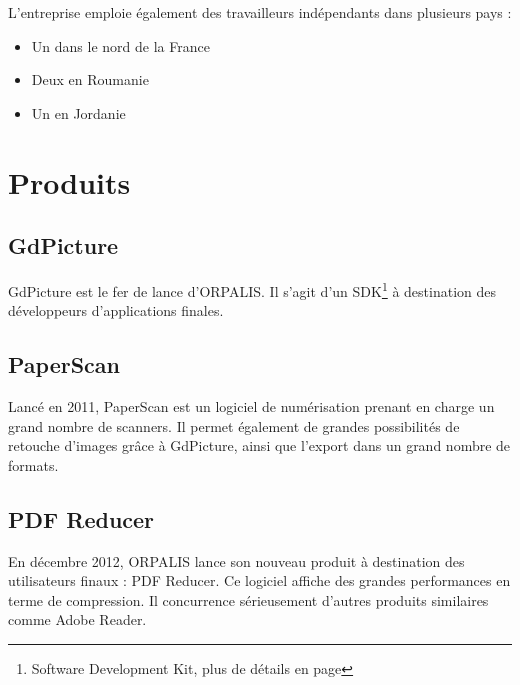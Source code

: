 L'entreprise emploie également des travailleurs indépendants dans plusieurs pays :

\begin{itemize}
\item Un dans le nord de la France
\item Deux en Roumanie
\item Un en Jordanie
\end{itemize}

\section{Produits}

\subsection{GdPicture}

GdPicture est le fer de lance d'ORPALIS. Il s'agit d'un SDK\footnote{Software Development Kit, plus de détails en page \pageref{gdpicture}} à destination des développeurs d'applications finales.

\subsection{PaperScan}

Lancé en 2011, PaperScan est un logiciel de numérisation prenant en charge un grand nombre de scanners. Il permet également de grandes possibilités de retouche d'images grâce à GdPicture, ainsi que l'export dans un grand nombre de formats.

\subsection{PDF Reducer}

En décembre 2012, ORPALIS lance son nouveau produit à destination des utilisateurs finaux : PDF Reducer. Ce logiciel affiche des grandes performances en terme de compression. Il concurrence sérieusement d'autres produits similaires comme Adobe Reader.